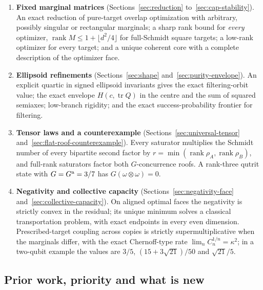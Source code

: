 \documentclass[11pt,a4paper]{article}
\theoremstyle{remark}\newtheorem{remark}[theorem]{Remark}
\DeclareMathOperator{\tr}{tr}\DeclareMathOperator{\diag}{diag}\DeclareMathOperator{\spec}{spec}
\DeclareMathOperator{\rank}{rank}\DeclareMathOperator{\Rea}{Re}
\begin{document}
\begin{enumerate}[leftmargin=2em,itemsep=3pt]
\item \textbf{Fixed marginal matrices} (Sections~\ref{sec:reduction}
to~\ref{sec:cap-stability}). An exact reduction of pure-target overlap
optimization with arbitrary, possibly singular or rectangular marginals; a
sharp rank bound for \emph{every} optimizer, $\rank M\le1+\lfloor d^2/4\rfloor$
for full-Schmidt square targets; a low-rank optimizer for every target; and a
unique coherent core with a complete description of the optimizer face.
\item \textbf{Ellipsoid refinements} (Sections~\ref{sec:shape}
and~\ref{sec:purity-envelope}). An explicit quartic in signed ellipsoid
invariants gives the exact filtering-orbit value; the exact envelope
$H(c,\tr Q)$ in the centre and the sum of squared semiaxes; low-branch
rigidity; and the exact success-probability frontier for filtering.
\item \textbf{Tensor laws and a counterexample}
(Sections~\ref{sec:universal-tensor} and~\ref{sec:flat-roof-counterexample}).
Every saturator multiplies the Schmidt number of every bipartite second
factor by $r=\min(\rank\rho_A,\rank\rho_B)$, and full-rank saturators factor
both $G$-concurrence roofs. A rank-three qutrit state with
$G=G^{\rm a}=3/7$ has $G(\omega\otimes\omega)=0$.
\item \textbf{Negativity and collective capacity}
(Sections~\ref{sec:negativity-face} and~\ref{sec:collective-capacity}). On
aligned optimal faces the negativity is strictly convex in the residual; its
unique minimum solves a classical transportation problem, with exact
endpoints in every even dimension. Prescribed-target coupling across copies
is strictly supermultiplicative when the marginals differ, with the exact
Chernoff-type rate $\lim_nC_n^{1/n}=\kappa^2$; in a two-qubit example the
values are $3/5$, $(15+3\sqrt{21})/50$ and $\sqrt{21}/5$.
\end{enumerate}

\subsection{Prior work, priority and what is new}\label{sec:priority}
\end{document}
